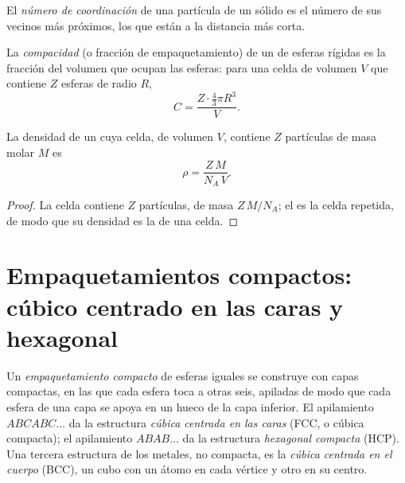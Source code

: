 \begin{definition}\label{def:b1:crystals-metals:coordination}
El \emph{número de coordinación} de una
partícula de un sólido es el número de sus vecinos más próximos, los que
están a la distancia más corta.
\end{definition}

\begin{definition}[Compacidad]\label{def:b1:crystals-metals:compactness}
La \emph{compacidad} (o fracción de empaquetamiento) de
un  de esferas rígidas es la fracción del volumen que ocupan las
esferas: para una celda de volumen $V$ que contiene $Z$ esferas de radio
$R$,
\[
  C = \frac{Z \cdot \frac43 \pi R^3}{V} .
\]
\end{definition}

\begin{proposition}\label{prop:b1:crystals-metals:density}
La densidad de un  cuya celda, de volumen $V$, contiene $Z$
partículas de masa molar $M$ es
\[
  \rho = \frac{Z\,M}{N_A\,V} .
\]
\end{proposition}

\begin{proof}
La celda contiene $Z$ partículas, de masa $Z\,M/N_A$; el  es la
celda repetida, de modo que su densidad es la de una celda.
\end{proof}

\section{Empaquetamientos compactos: cúbico centrado en las caras y hexagonal}

\begin{definition}\label{def:b1:crystals-metals:packings}
Un \emph{empaquetamiento compacto} de
esferas iguales se construye con capas compactas, en las que cada esfera
toca a otras seis, apiladas de modo que cada esfera de una capa se apoya
en un hueco de la capa inferior. El apilamiento $ABCABC\dots$ da la
estructura \emph{cúbica centrada en las caras}
(FCC, o cúbica compacta); el apilamiento $ABAB\dots$ da la estructura
\emph{hexagonal compacta} (HCP). Una tercera
estructura de los metales, no compacta, es la \emph{cúbica centrada en el
cuerpo} (BCC), un cubo con un átomo en cada vértice y otro en su
centro.
\end{definition}

